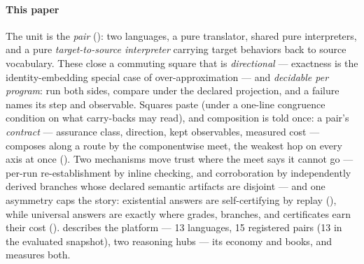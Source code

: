 \paragraph{This paper}
The unit is the \emph{pair} (): two languages, a
pure translator, shared pure interpreters, and a pure
\emph{target-to-source interpreter} carrying target behaviors back to
source vocabulary. These close a commuting square that is
\emph{directional} --- exactness is the identity-embedding special case
of over-approximation --- and \emph{decidable per program}: run both
sides, compare under the declared projection, and a failure names its
step and observable. Squares paste (under a one-line congruence
condition on what carry-backs may read), and composition is told once:
a pair's \emph{contract} --- assurance class, direction, kept
observables, measured cost --- composes along a route by the
componentwise meet, the weakest hop on every axis at once
(). Two mechanisms move trust where the meet says it
cannot go --- per-run re-establishment by inline checking, and
corroboration by independently derived branches whose declared
semantic artifacts are disjoint --- and one asymmetry caps the story:
existential answers are self-certifying by replay
(), while universal answers are exactly where
grades, branches, and certificates earn their cost
().  describes the
platform --- 13 languages, 15 registered pairs (13 in the evaluated
snapshot), two reasoning hubs ---  its economy and
books, and  measures both.

